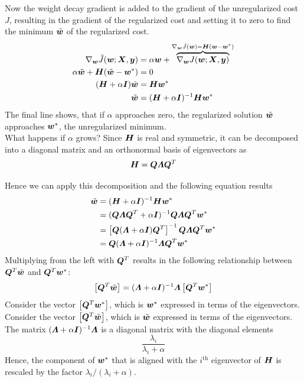 \begin{multicols}{2}
	Now the weight decay gradient is added to the gradient of the unregularized cost $J$, resulting in the gradient of the regularized cost and setting it to zero to find the minimum $\tilde{{\bm{w}}}$ of the regularized cost.
	\begin{align*}
	\nabla_{\bm{w}} \tilde{J}({\bm{w}};{\bm{X}},{\bm{y}})
	&= \alpha{\bm{w}} + \overbrace{\nabla_{\bm{w}} J({\bm{w}};{\bm{X}},{\bm{y}})}^{\nabla_{\bm{w}}\hat{J}({\bm{w}})={\bm{H}}({\bm{w}}-{\bm{w}}^\ast)}\\
	\alpha\tilde{{\bm{w}}}+{\bm{H}}(\tilde{{\bm{w}}}-{\bm{w}}^\ast) &= 0\\
	({\bm{H}}+\alpha{\bm{I}})\tilde{{\bm{w}}} &= {\bm{H}}{\bm{w}}^\ast\\
	\tilde{{\bm{w}}}&=({\bm{H}}+\alpha{\bm{I}})^{-1}{\bm{H}}{\bm{w}}^\ast
	\end{align*}
	The final line shows, that if $\alpha$ approaches zero, the regularized solution $\tilde{{\bm{w}}}$ approaches ${\bm{w}}^\ast$, the unregularized minimum.\\
	What happens if $\alpha$ grows? Since ${\bm{H}}$ is real and symmetric, it can be decomposed into a diagonal matrix and an orthonormal basis of eigenvectors as
	\[ \mH = \mQ\bol{\Lambda}\mQ^T \]

	Hence we can apply this decomposition and the following equation results
	\begin{align*}
	\tilde{\vw}	&= (\mH+\alpha\mI)^{-1}\mH\vw^\ast\\
	&= (\mQ\bol{\Lambda}\mQ^T+\alpha\mI)^{-1}\mQ\bol{\Lambda}\mQ^T\vw^\ast\\
	&=\left[\mQ(\bol{\Lambda}+\alpha\mI)\mQ^T\right]^{-1}\mQ\bol{\Lambda}\mQ^T\vw^\ast\\
	&= \mQ(\bol{\Lambda}+\alpha\mI)^{-1}\bol{\Lambda}\mQ^T\vw^\ast
	\end{align*}
	Multiplying from the left with ${\bm{Q}}^T$ results in the following relationship between ${\bm{Q}}^T\tilde{{\bm{w}}}$ and ${\bm{Q}}^T{\bm{w}}^\ast$:
	\[ \left[\mQ^T\tilde{\vw}\right] =(\bol{\Lambda}+\alpha\mI)^{-1}\bol{\Lambda}\left[\mQ^T\vw^\ast\right] \]
	Consider the vector $\left[{\bm{Q}}^T{\bm{w}}^\ast\right]$, which is ${\bm{w}}^\ast$ expressed in terms of the eigenvectors.\\
	Consider the vector $\left[{\bm{Q}}^T\tilde{{\bm{w}}}\right]$, which is $\tilde{{\bm{w}}}$ expressed in terms of the eigenvectors.\\
	The matrix $(\bol{\Lambda}+\alpha\mI)^{-1}\bol{\Lambda}$ is a diagonal matrix with the diagonal elements
	\[ \frac{\lambda_i}{\lambda_i+\alpha} \]
	Hence, the component of ${\bm{w}}^\ast$ that is aligned with the $i^{\text{th}}$ eigenvector of ${\bm{H}}$ is rescaled by the factor $\lambda_i/(\lambda_i+\alpha)$.\\


\end{multicols}
